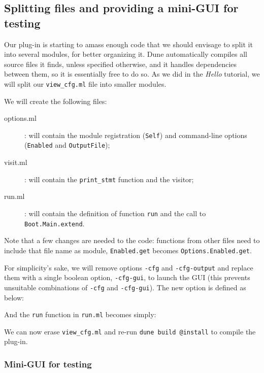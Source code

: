 \subsection{Splitting files and providing a mini-GUI for testing}
\label{tut2:split-and-gui}

Our plug-in is starting to amass enough code that we should envisage to split
it into several modules, for better organizing it. Dune automatically compiles
all source files it finds, unless specified otherwise, and it handles
dependencies between them, so it is essentially free to do so. As we did in the
{\em Hello} tutorial, we will split our \verb|view_cfg.ml| file into smaller
modules.

We will create the following files:

\begin{description}
\item[options.ml]: will contain the module registration (\verb|Self|) and
  command-line options (\verb|Enabled| and \verb|OutputFile|);
\item[visit.ml]: will contain the \verb|print_stmt| function and the visitor;
\item[run.ml]: will contain the definition of function \verb|run| and the
  call to \verb|Boot.Main.extend|.
\end{description}

Note that a few changes are needed to the code: functions from other files
need to include that file name as module, \eg
\verb|Enabled.get| becomes \verb|Options.Enabled.get|.

For simplicity's sake, we will remove options \verb|-cfg| and \verb|-cfg-output|
and replace them with a single boolean option, \verb|-cfg-gui|, to launch the
GUI (this prevents unsuitable combinations of \verb|-cfg| and \verb|-cfg-gui|).
The new option is defined as below:


And the \verb|run| function in \verb|run.ml| becomes simply:


We can now erase \verb|view_cfg.ml| and re-run \verb|dune build @install| to
compile the plug-in.

\subsubsection{Mini-GUI for testing}

